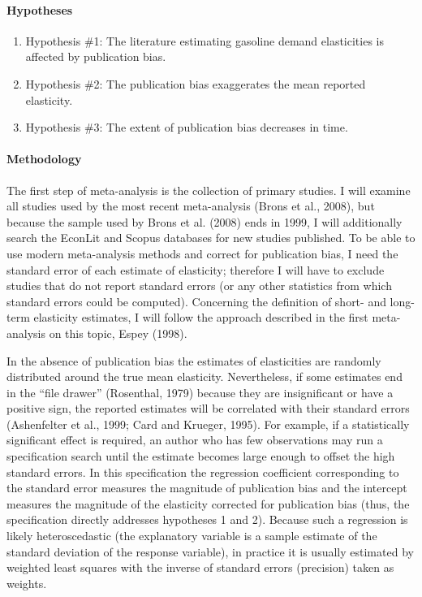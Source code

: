 \paragraph{Hypotheses}
\begin{enumerate}
		\item[] Hypothesis \#1: The literature estimating gasoline demand elasticities is affected by publication bias.
		\item[] Hypothesis \#2: The publication bias exaggerates the mean reported elasticity.
		\item[] Hypothesis \#3: The extent of publication bias decreases in time.
\end{enumerate}

\paragraph{Methodology}

The first step of meta-analysis is the collection of primary studies. I will examine all studies used by the most recent meta-analysis (Brons et al., 2008), but because the sample used by Brons et al. (2008) ends in 1999, I will additionally search the EconLit and Scopus databases for new studies published. To be able to use modern meta-analysis methods and correct for publication bias, I need the standard error of each estimate of elasticity; therefore I will have to exclude studies that do not report standard errors (or any other statistics from which standard errors could be computed). Concerning the definition of short- and long-term elasticity estimates, I will follow the approach described in the first meta-analysis on this topic, Espey (1998).

In the absence of publication bias the estimates of elasticities are randomly distributed  around  the  true  mean  elasticity. Nevertheless, if some estimates end in the ``file drawer'' (Rosenthal, 1979) because they are insignificant or have a positive sign, the reported estimates will be correlated with their standard errors (Ashenfelter et al., 1999; Card and Krueger, 1995). For example, if a statistically significant effect is required, an author who has few observations may run a specification search until the estimate becomes large enough to offset the high standard errors. In this specification the regression coefficient corresponding to the standard error measures the magnitude of publication bias and the intercept measures the magnitude of the elasticity corrected for publication bias (thus, the specification directly addresses hypotheses 1 and 2). Because such a regression is likely heteroscedastic (the explanatory variable is a sample estimate of the standard deviation of the response variable), in practice it is usually estimated by weighted least squares with the inverse of standard errors (precision) taken as weights.

